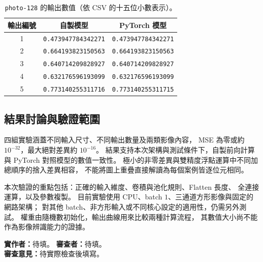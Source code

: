 \begin{table}[H]
  \centering
  \small
  \caption{\texttt{photo-128} 的輸出數值（依 CSV 的十五位小數表示）。}
  \label{tab:cnn-photo-values}
  \begin{tabular}{@{}ccc@{}}
    \toprule
    輸出編號 & 自製模型 & PyTorch 模型 \\
    \midrule
    1 & \texttt{0.473947784342271} & \texttt{0.473947784342271} \\
    2 & \texttt{0.664193823150563} & \texttt{0.664193823150563} \\
    3 & \texttt{0.640714209828927} & \texttt{0.640714209828927} \\
    4 & \texttt{0.632176596193099} & \texttt{0.632176596193099} \\
    5 & \texttt{0.773140255311716} & \texttt{0.773140255311715} \\
    \bottomrule
  \end{tabular}
\end{table}

\subsection{結果討論與驗證範圍}

四組實驗涵蓋不同輸入尺寸、不同輸出數量及兩類影像內容，
MSE 為零或約 $10^{-32}$，最大絕對差異約 $10^{-16}$。
結果支持本次架構與測試條件下，自製前向計算與 PyTorch 對照模型的數值一致性。
極小的非零差異與雙精度浮點運算中不同加總順序的捨入差異相容，
不能將圖上重疊直接解讀為每個案例皆逐位元相同。

本次驗證的重點包括：正確的輸入維度、卷積與池化規則、Flatten 長度、
全連接運算，以及參數複製。
目前實驗使用 CPU、batch $1$、三通道方形影像與固定的網路架構；
對其他 batch、非方形輸入或不同核心設定的適用性，仍需另外測試。
權重由隨機數初始化，輸出曲線用來比較兩種計算流程，
其數值大小尚不能作為影像辨識能力的證據。

\medskip
\noindent\textbf{實作者：}待填。\quad
\textbf{審查者：}待填。\\
\textbf{審查意見：}待實際檢查後填寫。
